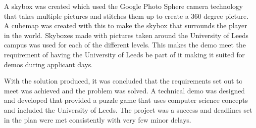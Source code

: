 \newline
\par
A skybox was created which used the Google Photo Sphere camera technology that takes multiple pictures and stitches them up to create a 360 degree picture. A cubemap was created with this to make the skybox that surrounds the player in the world. Skyboxes made with pictures taken around the University of Leeds campus was used for each of the different levels. This makes the demo meet the requirement of having the University of Leeds be part of it making it suited for demos during applicant days.
\newline
\par
With the solution produced, it was concluded that the requirements set out to meet was achieved and the problem was solved. A technical demo was designed and developed that provided a puzzle game that uses computer science concepts and included the University of Leeds. The project was a success and deadlines set in the plan were met consistently with very few minor delays.

